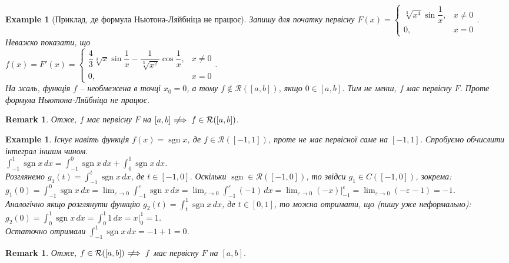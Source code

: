 \documentclass[a4paper, 10pt]{article}
\def\huge{\displaystyle}
\DeclareMathOperator\sign{sgn}
\theoremstyle{theoremdd}
\theoremstyle{theoremdd}
\theoremstyle{theoremdd}
\theoremstyle{theoremdd}
\theoremstyle{theoremdd}
\newtheorem{example}[theorem]{Example}
\theoremstyle{theoremdd}
\theoremstyle{theoremdd}
\newtheorem{remark}[theorem]{Remark}
\theoremstyle{theoremdd}
\theoremstyle{theoremdd}
\newcommand{\notimplies}{\;\not\!\!\!\implies}
\begin{document}
\begin{example}[Приклад, де формула Ньютона-Ляйбніца не працює]
Запишу для початку первісну $F(x) = \begin{cases} \sqrt[3]{x^4} \sin \dfrac{1}{x}, & x \neq 0 \\ 0, & x = 0 \end{cases}$. Неважко показати, що\\
$f(x) = F'(x) = \begin{cases} \dfrac{4}{3} \sqrt[3]{x} \sin \dfrac{1}{x} - \dfrac{1}{\sqrt[3]{x^2}} \cos \dfrac{1}{x}, & x \neq 0 \\ 0, & x = 0 \end{cases}$.\\
На жаль, функція $f$ -- необмежена в точці $x_0 = 0$, а тому $f \not\in \mathcal{R}([a,b])$, якщо $0 \in [a,b]$. Тим не менш, $f$ має первісну $F$. Проте формула Ньютона-Ляйбніца не працює.
\end{example}

\begin{remark}
Отже, $f$ має первісну $F$ на $[a,b] \notimplies f \in \mathcal{R}([a,b])$.
\end{remark}

\begin{example}
Існує навіть функція $f(x) = \sign x$, де $f \in \mathcal{R}([-1,1])$, проте не має первісної саме на $[-1,1]$. Спробуємо обчислити інтеграл іншим чином.\\
$\huge\int_{-1}^1 \sign x \,dx = \int_{-1}^0 \sign x \,dx + \int_0^1 \sign x \,dx$.\\
Розглянемо $g_1(t) = \huge\int_{-1}^t \sign x\,dx$, де $t \in [-1,0]$. Оскільки $\sign \in \mathcal{R}([-1,0])$, то звідси $g_1 \in C([-1,0])$, зокрема:\\
$g_1(0) = \huge\int_{-1}^0 \sign x\,dx = \lim_{\varepsilon \to 0} \int_{-1}^\varepsilon \sign x\,dx = \lim_{\varepsilon \to 0} \int_{-1}^\varepsilon (-1)\,dx = \lim_{\varepsilon \to 0} (-x)\Big|_{-1}^{\varepsilon} = \lim_{\varepsilon \to 0} (-\varepsilon-1) = -1$.\\
Аналогічно якщо розглянути функцію $g_2(t) = \huge\int_t^1 \sign x\,dx$, де $t \in [0,1]$, то можна отримати, що (пишу уже неформально): \\
$g_2(0) = \huge\int_0^1 \sign x\,dx = \int_0^1 1\,dx = x\Big|_0^1 = 1$.\\
Остаточно отримали $\huge\int_{-1}^1 \sign x \,dx = -1 + 1 = 0$.
\end{example}

\begin{remark}
Отже, $f \in \mathcal{R}([a,b]) \notimplies f$ має первісну $F$ на $[a,b]$.
\end{remark}
\end{document}
